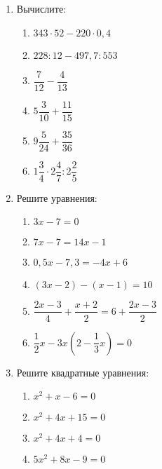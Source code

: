 \documentclass[12pt, a4paper]{article}
\begin{document}
	
	\begin{enumerate}
		\item Вычислите:
		\begin{multicols}{2}
			\begin{enumerate}[label=\asbuk*)]
			\item $343\cdot 52 - 220 \cdot 0,4$
			\item $228:12-497,7:553$
			\item $\dfrac{7}{12}-\dfrac{4}{13}$
			\item $5\dfrac{3}{10}+\dfrac{11}{15}$
			\item $9\dfrac{5}{24}+\dfrac{35}{36}$
			\item $1\dfrac{3}{4}\cdot 2\dfrac{4}{7}:2\dfrac{2}{5}$
		\end{enumerate}
		\end{multicols}
	\item Решите уравнения:
			\begin{multicols}{2}
			\begin{enumerate}[label=\asbuk*)]
				\item $3x-7=0$
				\item $7x-7=14x-1$
				\item $0,5x-7,3=-4x+6$
				\item $(3x-2)-(x-1)=10$
				\item $\dfrac{2x-3}{4}+\dfrac{x+2}{2}=6+\dfrac{2x-3}{2}$
				\item $\dfrac{1}{2}x-3x\left( 2-\dfrac{1}{3}x\right)=0 $
			\end{enumerate}
		\end{multicols}
	\item Решите квадратные уравнения:
	\begin{multicols}{2}
		\begin{enumerate}[label=\asbuk*)]
			\item $x^2+x-6=0$
			\item $x^2+4x+15=0$
			\item $x^2+4x+4=0$
			\item $5x^2+8x-9=0$
		\end{enumerate}
	\end{multicols}
	\end{enumerate}
\end{document}
